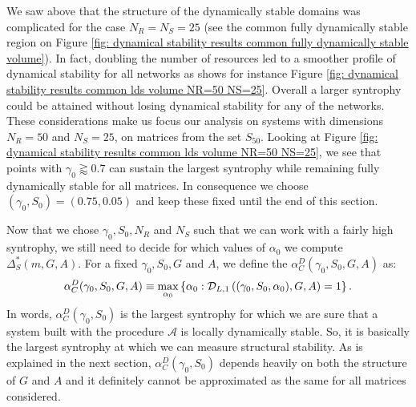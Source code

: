 \documentclass[12pt, titlepage]{report}
\begin{document}
We saw above that the structure of the dynamically stable domains was complicated for the case $N_R=N_S=25$ (see \eg the common fully dynamically stable region on Figure \ref{fig: dynamical stability results common fully dynamically stable volume}). In fact, doubling the number of resources led to a smoother profile of dynamical stability for all networks as shows for instance Figure \ref{fig: dynamical stability results common lds volume NR=50 NS=25}. Overall a larger syntrophy could be attained without losing dynamical stability for any of the networks. These considerations make us focus our analysis on systems with dimensions $N_R=50$ and $N_S=25$, \ie on matrices from the set $S_{50}$.
Looking at Figure \ref{fig: dynamical stability results common lds volume NR=50 NS=25}, we see that points with $\gamma_0 \gtrapprox 0.7$ can sustain the largest syntrophy while remaining fully dynamically stable for all matrices. In consequence we choose $(\gamma_0, S_0)=(0.75, 0.05)$ and keep these fixed until the end of this section.

Now that we chose $\gamma_0, S_0, N_R$ and $N_S$ such that we can work with a fairly high syntrophy, we still need to decide for which values of $\alpha_0$ we compute $\Delta_S^*(m, G, A)$. For a fixed $\gamma_0, S_0, G$ and $A$, we define the  $\alpha_C^D(\gamma_0, S_0, G, A)$ as:
\begin{equation}
 \alpha_C^D(\gamma_0, S_0, G, A)\equiv \max_{\alpha_0}\left\{\alpha_0 : \mathcal{D}_{L,1}\left((\gamma_0, S_0, \alpha_0), G, A\right)=1\right\}.
\end{equation}
In words, $\alpha_C^D(\gamma_0, S_0)$ is the largest syntrophy for which we are sure that a system built with the procedure $\mathcal{A}$ is locally dynamically stable. So, it is basically the largest syntrophy at which we can measure structural stability. As is explained in the next section, $\alpha_C^D(\gamma_0, S_0)$ depends heavily on both the structure of $G$ and $A$ and it definitely cannot be approximated as the same for all matrices considered.
\end{document}
